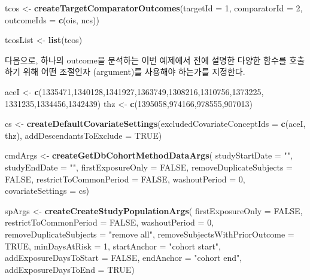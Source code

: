 \documentclass[11pt]{book}
\newenvironment{Shaded}{\begin{snugshade}}{\end{snugshade}}
\newcommand{\KeywordTok}[1]{\textcolor[rgb]{0.13,0.29,0.53}{\textbf{#1}}}
\newcommand{\DataTypeTok}[1]{\textcolor[rgb]{0.13,0.29,0.53}{#1}}
\newcommand{\DecValTok}[1]{\textcolor[rgb]{0.00,0.00,0.81}{#1}}
\newcommand{\StringTok}[1]{\textcolor[rgb]{0.31,0.60,0.02}{#1}}
\newcommand{\OtherTok}[1]{\textcolor[rgb]{0.56,0.35,0.01}{#1}}
\newcommand{\NormalTok}[1]{#1}
\theoremstyle{definition}
\theoremstyle{definition}
\theoremstyle{definition}
\theoremstyle{remark}
\begin{document}
\begin{Shaded}
\begin{Highlighting}[]
\NormalTok{tcos <-}\StringTok{ }\KeywordTok{createTargetComparatorOutcomes}\NormalTok{(}\DataTypeTok{targetId =} \DecValTok{1}\NormalTok{,}
                                       \DataTypeTok{comparatorId =} \DecValTok{2}\NormalTok{,}
                                       \DataTypeTok{outcomeIds =} \KeywordTok{c}\NormalTok{(ois, ncs))}

\NormalTok{tcosList <-}\StringTok{ }\KeywordTok{list}\NormalTok{(tcos)}
\end{Highlighting}
\end{Shaded}

다음으로, 하나의 outcome을 분석하는 이번 예제에서 전에 설명한 다양한
함수를 호출하기 위해 어떤 조절인자 (argument)를 사용해야 하는가를
지정한다.

\begin{Shaded}
\begin{Highlighting}[]
\NormalTok{aceI <-}\StringTok{ }\KeywordTok{c}\NormalTok{(}\DecValTok{1335471}\NormalTok{,}\DecValTok{1340128}\NormalTok{,}\DecValTok{1341927}\NormalTok{,}\DecValTok{1363749}\NormalTok{,}\DecValTok{1308216}\NormalTok{,}\DecValTok{1310756}\NormalTok{,}\DecValTok{1373225}\NormalTok{,}
          \DecValTok{1331235}\NormalTok{,}\DecValTok{1334456}\NormalTok{,}\DecValTok{1342439}\NormalTok{)}
\NormalTok{thz <-}\StringTok{ }\KeywordTok{c}\NormalTok{(}\DecValTok{1395058}\NormalTok{,}\DecValTok{974166}\NormalTok{,}\DecValTok{978555}\NormalTok{,}\DecValTok{907013}\NormalTok{)}

\NormalTok{cs <-}\StringTok{ }\KeywordTok{createDefaultCovariateSettings}\NormalTok{(}\DataTypeTok{excludedCovariateConceptIds =} \KeywordTok{c}\NormalTok{(aceI,}
\NormalTok{                                                                     thz),}
                                     \DataTypeTok{addDescendantsToExclude =} \OtherTok{TRUE}\NormalTok{)}

\NormalTok{cmdArgs <-}\StringTok{ }\KeywordTok{createGetDbCohortMethodDataArgs}\NormalTok{(}
  \DataTypeTok{studyStartDate =} \StringTok{""}\NormalTok{,}
  \DataTypeTok{studyEndDate =} \StringTok{""}\NormalTok{,}
  \DataTypeTok{firstExposureOnly =} \OtherTok{FALSE}\NormalTok{,}
  \DataTypeTok{removeDuplicateSubjects =} \OtherTok{FALSE}\NormalTok{,}
  \DataTypeTok{restrictToCommonPeriod =} \OtherTok{FALSE}\NormalTok{,}
  \DataTypeTok{washoutPeriod =} \DecValTok{0}\NormalTok{,}
  \DataTypeTok{covariateSettings =}\NormalTok{ cs)}

\NormalTok{spArgs <-}\StringTok{ }\KeywordTok{createCreateStudyPopulationArgs}\NormalTok{(}
  \DataTypeTok{firstExposureOnly =} \OtherTok{FALSE}\NormalTok{,}
  \DataTypeTok{restrictToCommonPeriod =} \OtherTok{FALSE}\NormalTok{,}
  \DataTypeTok{washoutPeriod =} \DecValTok{0}\NormalTok{,}
  \DataTypeTok{removeDuplicateSubjects =} \StringTok{"remove all"}\NormalTok{,}
  \DataTypeTok{removeSubjectsWithPriorOutcome =} \OtherTok{TRUE}\NormalTok{,}
  \DataTypeTok{minDaysAtRisk =} \DecValTok{1}\NormalTok{,}
  \DataTypeTok{startAnchor =} \StringTok{"cohort start"}\NormalTok{,}
  \DataTypeTok{addExposureDaysToStart =} \OtherTok{FALSE}\NormalTok{,}
  \DataTypeTok{endAnchor =} \StringTok{"cohort end"}\NormalTok{,}
  \DataTypeTok{addExposureDaysToEnd =} \OtherTok{TRUE}\NormalTok{)}


\end{Highlighting}
\end{Shaded}
\end{document}
